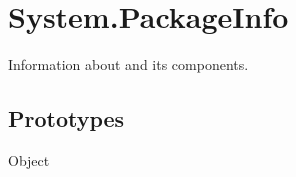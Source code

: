 
\section{System.PackageInfo}
Information about \usdk and its components.

\subsection{Prototypes}
\begin{refObjects}
\item[Object]
\end{refObjects}

